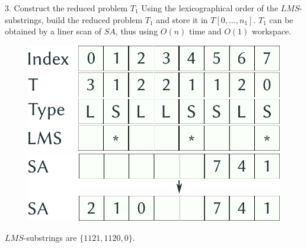 \documentclass{beamer}
\begin{document}
  \begin{frame}{3. Construct the reduced problem $T_1$}
    Using the lexicographical order of the $LMS$-substrings, build the reduced problem $T_1$ and store it in $T[0, \dots, n_1]$.
$T_1$ can be obtained by a liner scan of $SA$, thus using $O(n)$ time and $O(1)$ workspace.

    \begin{figure}
    \centering
    \begin{minipage}{.5\textwidth}
      \centering
      \includegraphics[width=.9\linewidth]{img/preliminary.pdf}
    \end{minipage}%
    \begin{minipage}{.5\textwidth}
      \centering
      \includegraphics[width=.9\linewidth]{img/SA_3.pdf}
    \end{minipage}
    \end{figure}

    $LMS$-substrings are $\{ 1121, 1120, 0 \}$.

  \end{frame}
\end{document}
